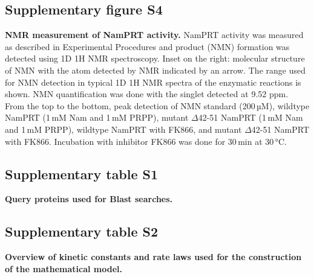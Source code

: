 \subsection*{Supplementary figure S4}

\textbf{NMR measurement of NamPRT activity.} NamPRT activity was measured as described in Experimental Procedures and product (NMN) formation was detected using 1D 1H NMR spectroscopy. Inset on the right: molecular structure of NMN with the atom detected by NMR indicated by an arrow. The range used for NMN detection in typical 1D 1H NMR spectra of the enzymatic reactions is shown. NMN quantification was done with the singlet detected at 9.52 ppm. From the top to the bottom, peak detection of NMN standard (200\,µM), wildtype NamPRT (1\,mM Nam and 1\,mM PRPP), mutant $\Delta$42-51 NamPRT (1\,mM Nam and 1\,mM PRPP), wildtype NamPRT with FK866, and mutant $\Delta$42-51 NamPRT with FK866. Incubation with inhibitor FK866 was done for 30\,min at 30\,°C.


\subsection*{Supplementary table S1}

\textbf{Query proteins used for Blast searches.}


\subsection*{Supplementary table S2}

\textbf{Overview of kinetic constants and rate laws used for the construction of the mathematical model.}
